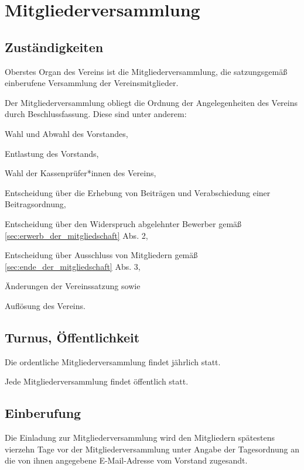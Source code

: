 \chapter{Mitgliederversammlung}

\section{Zuständigkeiten}
\begin{absätze}
	\item Oberstes Organ des Vereins ist die Mitgliederversammlung, die satzungsgemäß einberufene Versammlung der Vereinsmitglieder.
    \item Der Mitgliederversammlung obliegt die Ordnung der Angelegenheiten des Vereins durch Beschlussfassung. Diese sind unter anderem:
    \begin{sätze}
        \item Wahl und Abwahl des Vorstandes,
        \item Entlastung des Vorstands,
        \item Wahl der Kassenprüfer*innen des Vereins,
        \item Entscheidung über die Erhebung von Beiträgen und Verabschiedung einer Beitragsordnung,
        \item Entscheidung über den Widerspruch abgelehnter Bewerber gemäß \ref{sec:erwerb_der_mitgliedschaft} Abs. 2,
        \item Entscheidung über Ausschluss von Mitgliedern gemäß \ref{sec:ende_der_mitgliedschaft} Abs. 3,
        \item Änderungen der Vereinssatzung sowie
        \item Auflösung des Vereins.
    \end{sätze}
\end{absätze}

\section{Turnus, Öffentlichkeit}
\begin{absätze}
    \item Die ordentliche Mitgliederversammlung findet jährlich statt.
    \item Jede Mitgliederversammlung findet öffentlich statt.
\end{absätze}

\section{Einberufung}\label{sec:einberufung}
Die Einladung zur Mitgliederversammlung wird den Mitgliedern spätestens vierzehn Tage vor der Mitgliederversammlung unter Angabe der Tagesordnung an die von ihnen angegebene E-Mail-Adresse vom Vorstand zugesandt.

